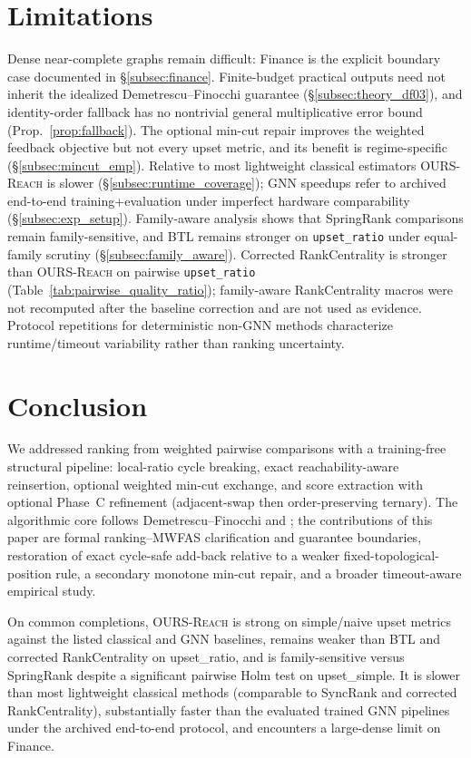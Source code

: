 \documentclass{article}
\begin{document}
\section{Limitations}
\label{sec:limitations}
Dense near-complete graphs remain difficult: Finance is the explicit boundary case documented in \S\ref{subsec:finance}.
Finite-budget practical outputs need not inherit the idealized Demetrescu--Finocchi guarantee (\S\ref{subsec:theory_df03}), and identity-order fallback has no nontrivial general multiplicative error bound (Prop.~\ref{prop:fallback}).
The optional min-cut repair improves the weighted feedback objective but not every upset metric, and its benefit is regime-specific (\S\ref{subsec:mincut_emp}).
Relative to most lightweight classical estimators \textsc{OURS-Reach} is slower (\S\ref{subsec:runtime_coverage}); GNN speedups refer to archived end-to-end training+evaluation under imperfect hardware comparability (\S\ref{subsec:exp_setup}).
Family-aware analysis shows that SpringRank comparisons remain family-sensitive, and BTL remains stronger on \texttt{upset\_ratio} under equal-family scrutiny (\S\ref{subsec:family_aware}). Corrected RankCentrality is stronger than \textsc{OURS-Reach} on pairwise \texttt{upset\_ratio} (Table~\ref{tab:pairwise_quality_ratio}); family-aware RankCentrality macros were not recomputed after the baseline correction and are not used as evidence.
Protocol repetitions for deterministic non-GNN methods characterize runtime/timeout variability rather than ranking uncertainty.

\section{Conclusion}
\label{sec:conclusion}
We addressed ranking from weighted pairwise comparisons with a training-free structural pipeline: local-ratio cycle breaking, exact reachability-aware reinsertion, optional weighted min-cut exchange, and score extraction with optional Phase~C refinement (adjacent-swap then order-preserving ternary).
The algorithmic core follows Demetrescu--Finocchi and \citet{VK25}; the contributions of this paper are formal ranking--MWFAS clarification and guarantee boundaries, restoration of exact cycle-safe add-back relative to a weaker fixed-topological-position rule, a secondary monotone min-cut repair, and a broader timeout-aware empirical study.

On common completions, \textsc{OURS-Reach} is strong on simple/naive upset metrics against the listed classical and GNN baselines, remains weaker than BTL and corrected RankCentrality on upset\_ratio, and is family-sensitive versus SpringRank despite a significant pairwise Holm test on upset\_simple.
It is slower than most lightweight classical methods (comparable to SyncRank and corrected RankCentrality), substantially faster than the evaluated trained GNN pipelines under the archived end-to-end protocol, and encounters a large-dense limit on Finance.
\end{document}
